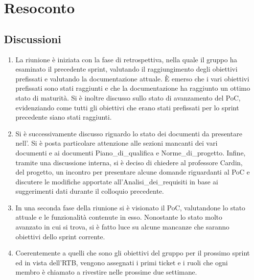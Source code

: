 \section{Resoconto} \label{sec:resoconto}
\subsection{Discussioni} \label{subsec:resdiscussione}
\begin{enumerate}
    \item La riunione è iniziata con la fase di retrospettiva, nella quale il gruppo ha esaminato il precedente sprint, valutando il raggiungimento degli obiettivi prefissati e valutando la documentazione attuale.
    È emerso che i vari obiettivi prefissati sono stati raggiunti e che la documentazione ha raggiunto un ottimo stato di maturità. Si è inoltre discusso sullo stato di avanzamento del PoC, evidenziando come tutti gli obiettivi che erano stati prefissati per lo sprint precedente siano stati raggiunti.
    \item Si è successivamente discusso riguardo lo stato dei documenti da presentare nell'. Si è posta particolare attenzione alle sezioni mancanti dei vari documenti e ai documenti Piano\_di\_qualifica e Norme\_di\_progetto. 
    Infine, tramite una discussione interna, si è deciso di chiedere al professore Cardin,  del progetto, un incontro per presentare alcune domande riguardanti al PoC e discutere le modifiche apportate all'Analisi\_dei\_requisiti in base ai suggerimenti dati durante il colloquio precedente.
    \item In una seconda fase della riunione si è visionato il PoC, valutandone lo stato attuale e le funzionalità contenute in esso. Nonostante lo stato molto avanzato in cui si trova, si è fatto luce su alcune mancanze che saranno obiettivi dello sprint corrente.
    \item Coerentemente a quelli che sono gli obiettivi del gruppo per il prossimo sprint ed in vista dell'RTB, vengono assegnati i primi ticket e i ruoli che ogni membro è chiamato a rivestire nelle prossime due settimane.
\end{enumerate}


